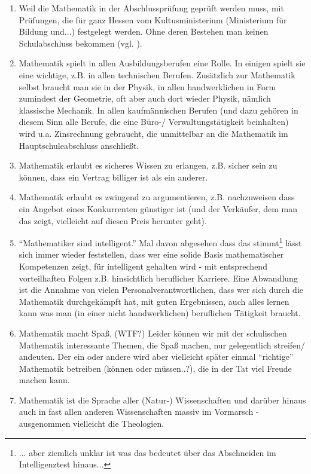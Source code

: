 \documentclass[a4paper]{book}%
\theoremstyle{definition}
\begin{document}
\begin{enumerate}
    \item Weil die Mathematik in der Abschlussprüfung geprüft werden muss, mit Prüfungen, die für ganz Hessen vom Kultusministerium (Ministerium für Bildung und...) festgelegt werden. Ohne deren Bestehen man keinen Schulabschluss bekommen (vgl. \citep{LehrplanMathematikHauptschuleHessen2017}).
    \item Mathematik spielt in allen Ausbildungsberufen eine Rolle. In einigen spielt sie eine wichtige, z.B. in allen technischen Berufen. Zusätzlich zur Mathematik selbst braucht man sie in der Physik, in allen handwerklichen in Form zumindest der Geometrie, oft aber auch dort wieder Physik, nämlich klassische Mechanik. In allen kaufmännischen Berufen (und dazu gehören in diesem Sinn alle Berufe, die eine Büro-/ Verwaltungstätigkeit beinhalten) wird u.a. Zinsrechnung gebraucht, die unmittelbar an die Mathematik im Hauptschuleabschluss anschließt.
    \item Mathematik erlaubt es sicheres Wissen zu erlangen, z.B. sicher sein zu können, dass ein Vertrag billiger ist als ein anderer.
    \item Mathematik erlaubt es zwingend zu argumentieren, z.B. nachzuweisen dass ein Angebot eines Konkurrenten günstiger ist (und der Verkäufer, dem man das zeigt, vielleicht auf diesen Preis herunter geht).
    \item \enquote{Mathematiker sind intelligent.} Mal davon abgesehen dass das stimmt\footnote{... aber ziemlich unklar ist was das bedeutet über das Abschneiden im Intelligenztest hinaus...} lässt sich immer wieder feststellen, dass wer eine solide Basis mathematischer Kompetenzen zeigt, für intelligent gehalten wird - mit entsprechend vorteilhaften Folgen z.B. hinsichtlich beruflicher Karriere. Eine Abwandlung ist die Annahme von vielen Personalverantwortlichen, dass wer sich durch die Mathematik durchgekämpft hat, mit guten Ergebnissen, auch alles lernen kann was man (in einer nicht handwerklichen) beruflichen Tätigkeit braucht.
    \item Mathematik macht Spaß. (WTF?) Leider können wir mit der schulischen Mathematik interessante Themen, die Spaß machen, nur gelegentlich streifen/ andeuten. Der ein oder andere wird aber vielleicht später einmal \enquote{richtige} Mathematik betreiben (können oder müssen..?), die in der Tat viel Freude machen kann.
    \item Mathematik ist die Sprache aller (Natur-) Wissenschaften und darüber hinaus auch in fast allen anderen Wissenschaften massiv im Vormarsch - ausgenommen vielleicht die Theologien.

\end{enumerate}
\end{document}
